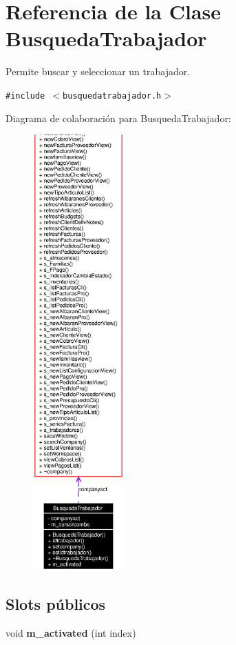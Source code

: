 \section{Referencia de la Clase Busqueda\-Trabajador}
\label{classBusquedaTrabajador}
Permite buscar y seleccionar un trabajador.  


{\tt \#include $<$busquedatrabajador.h$>$}

Diagrama de colaboraci\'{o}n para Busqueda\-Trabajador:\begin{figure}[H]
\begin{center}
\leavevmode
\includegraphics[width=99pt]{classBusquedaTrabajador__coll__graph}
\end{center}
\end{figure}
\subsection*{Slots p\'{u}blicos}
\begin{CompactItemize}
\item 
void {\bf m\_\-activated} (int index)\label{classBusquedaTrabajador_i0}

\end{CompactItemize}
